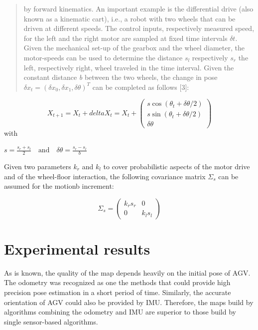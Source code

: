 \documentclass{article}
\begin{document}
\begin{quote}
     by forward kinematics. An important example is the differential drive (also known as a kinematic cart), i.e., a robot with two wheels that can be driven at different speeds. The control inputs, respectively measured speed, for the left and the right motor are sampled at fixed time intervals $\mathit{\delta}\mathit{t}$. Given the mechanical set-up of the gearbox and the wheel diameter, the motor-speeds can be used to determine the distance $\mathit{s_{l}}$ respectively $\mathit{s_{r}}$ the left, respectively right, wheel traveled in the time interval. Given the constant distance \textit{b} between the two wheels, the change in pose $\delta x_{t}= \left(\delta x_{0}, \delta x_{1}, \mathit{\delta}\mathit{\theta}\right)^T$ can be completed as follows [3]:
\end{quote}
    
    

 \begin{equation}
     X_{\textit{t}+1} = X_{\textit{t}} + delta X_{\textit{t}} = X_{t} + \left(\begin{array}{c} \textit{s}\cos(\theta_{\textit{t}}+ \delta \theta/2)\\ \textit{s}\sin(\theta_{\textit{t}}+ \delta \theta/2) \\ \delta \theta \end{array} \right)
 \end{equation}
 with 
\begin{center}
    $s = \frac{s_{r}+s_{l}}{2}\hspace{1em}\text{and}\hspace{1em}\delta \theta = \frac{s_{r}-s_{l}}{b}$
\end{center}



 Given two parameters $\mathit{k_{r}}$ and $\mathit{k_{l}}$ to cover probabilistic aspects of the motor drive and of the wheel-floor interaction, the following covariance matrix $\Sigma_{s}$ can be assumed for the motionb increment: 

 \begin{equation}
     \Sigma_{s}= \left(\begin{array}{cc} k_{r}s_{r} & 0\\ 0 & k_{l}s_{l}    \end{array}\right)
 \end{equation}

 \section{Experimental results}
 As is known, the quality of the map depends heavily on the initial pose of AGV. The odometry was recognized as one the methods that could provide high precision pose estimation in a short period of time. Similarly, the accurate orientation of AGV could also be provided by IMU. Therefore, the maps build by algorithms combining the odometry and IMU are superior to those build by single sensor-based algorithms. 
\end{document}
